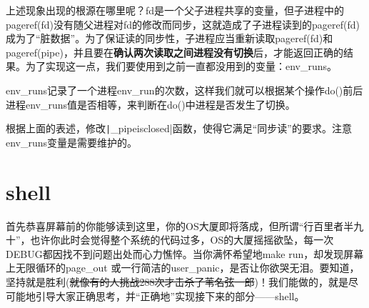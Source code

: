 上述现象出现的根源在哪里呢？fd是一个父子进程共享的变量，但子进程中的pageref(fd)没有随父进程对fd的修改而同步，这就造成了子进程读到的pageref(fd)成为了“脏数据”。为了保证读的同步性，子进程应当重新读取pageref(fd)和pageref(pipe)，并且要在\textbf{确认两次读取之间进程没有切换}后，才能返回正确的结果。为了实现这一点，我们要使用到之前一直都没用到的变量：env\_runs。

env\_runs记录了一个进程env\_run的次数，这样我们就可以根据某个操作do()前后进程env\_runs值是否相等，来判断在do()中进程是否发生了切换。

\begin{exercise}
	根据上面的表述，修改\texttt|_pipeisclosed|函数，使得它满足“同步读”的要求。注意env\_runs变量是需要维护的。
\end{exercise}

\section{shell}






首先恭喜屏幕前的你能够读到这里，你的OS大厦即将落成，但所谓“行百里者半九十”，也许你此时会觉得整个系统的代码过多，OS的大厦摇摇欲坠，每一次DEBUG都因找不到问题出处而心力憔悴。当你满怀希望地make run，却发现屏幕上无限循环的page_out 或一行简洁的user_panic，是否让你欲哭无泪。要知道，坚持就是胜利(\sout{就像有的人挑战288次才击杀了苇名弦一郎})！我们能做的，就是尽可能地引导大家正确思考，并“正确地”实现接下来的部分——shell。

